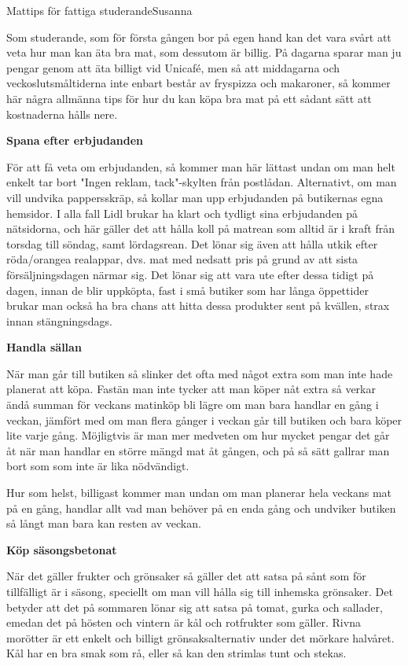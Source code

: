 \documentclass{spektraklet}
\begin{document}
\begin{artikel}{Mattips för fattiga studerande}{Susanna}
\begin{twocolumns}
Som studerande, som för första gången bor på egen hand kan det vara svårt att veta hur man kan äta bra mat, som dessutom är billig. På dagarna sparar man ju pengar genom att äta billigt vid Unicafé, men så att middagarna och veckoslutsmåltiderna inte enbart består av fryspizza och makaroner, så kommer här några allmänna tips för hur du kan köpa bra mat på ett sådant sätt att kostnaderna hålls nere.

\textbf{Spana efter erbjudanden}

För att få veta om erbjudanden, så kommer man här lättast undan om man helt enkelt tar bort "Ingen reklam, tack"-skylten från postlådan. Alternativt, om man vill undvika pappersskräp, så kollar man upp erbjudanden på butikernas egna hemsidor. I alla fall Lidl brukar ha klart och tydligt sina erbjudanden på nätsidorna, och här gäller det att hålla koll på matrean som alltid är i kraft från torsdag till söndag, samt lördagsrean.
Det lönar sig även att hålla utkik efter röda/orangea realappar, dvs. mat med nedsatt pris på grund av att sista försäljningsdagen närmar sig. Det lönar sig att vara ute efter dessa tidigt på dagen, innan de blir uppköpta, fast i små butiker som har långa öppettider brukar man också ha bra chans att hitta dessa produkter sent på kvällen, strax innan stängningsdags.

\textbf{Handla sällan}

När man går till butiken så slinker det ofta med något extra som man inte hade planerat att köpa. Fastän man inte tycker att man köper nåt extra så verkar ändå summan för veckans matinköp bli lägre om man bara handlar en gång i veckan, jämfört med om man flera gånger i veckan går till butiken och bara köper lite varje gång. Möjligtvis är man mer medveten om hur mycket pengar det går åt när man handlar en större mängd mat åt gången, och på så sätt gallrar man bort som som inte är lika nödvändigt.

Hur som helst, billigast kommer man undan om man planerar hela veckans mat på en gång, handlar allt vad man behöver på en enda gång och undviker butiken så långt man bara kan resten av veckan.

\textbf{Köp säsongsbetonat}

När det gäller frukter och grönsaker så gäller det att satsa på sånt som för tillfälligt är i säsong, speciellt om man vill hålla sig till inhemska grönsaker. Det betyder att det på sommaren lönar sig att satsa på tomat, gurka och sallader, emedan det på hösten och vintern är kål och rotfrukter som gäller. Rivna morötter är ett enkelt och billigt grönsaksalternativ under det mörkare halvåret. Kål har en bra smak som rå, eller så kan den strimlas tunt och stekas.


\end{twocolumns}
\end{artikel}
\end{document}
